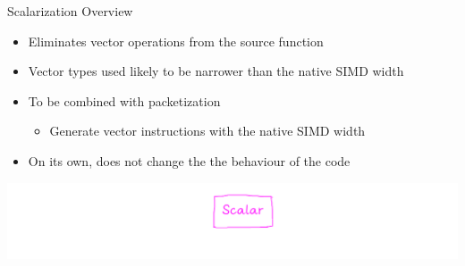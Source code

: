 
\begin{frame}[fragile]{Scalarization Overview}

\begin{itemize}
    \item Eliminates vector operations from the source function
    \item Vector types used likely to be narrower than the native SIMD width
    \item To be combined with packetization
    \begin{itemize}
        \item Generate vector instructions with the native SIMD width
    \end{itemize}
    \item On its own, does not change the the behaviour of the code
\end{itemize}

\vfill
\hspace{1em}\includegraphics[scale=0.55]{images/stages-scalar.pdf}

\end{frame}


%
%    
%    
%

